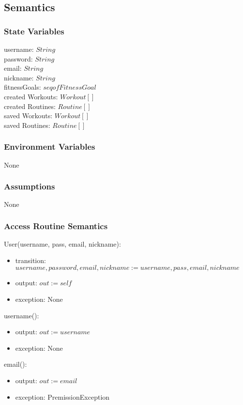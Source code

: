 \documentclass[12pt, titlepage]{article}
\begin{document}
\subsection{Semantics}

\subsubsection{State Variables}
username: $String$ \\
password: $String$ \\
email: $String$ \\
nickname: $String$ \\
fitnessGoals: $seq of FitnessGoal$ \\
created Workouts: $Workout[]$ \\
created Routines: $Routine[]$ \\
saved Workouts: $Workout[]$ \\
saved Routines: $Routine[]$ \\

\subsubsection{Environment Variables}
None
\subsubsection{Assumptions}
None
\subsubsection{Access Routine Semantics}

User(username, pass, email, nickname):
\begin{itemize}
	\item transition: $username, password, email, nickname := username, pass, email, nickname$
	\item output: $out := self$
	\item exception: None
\end{itemize}

username():
\begin{itemize}
	\item output: $out := username$
	\item exception: None
\end{itemize}

email():
\begin{itemize}
	\item output: $out := email$
	\item exception: PremissionException
\end{itemize}
\end{document}
